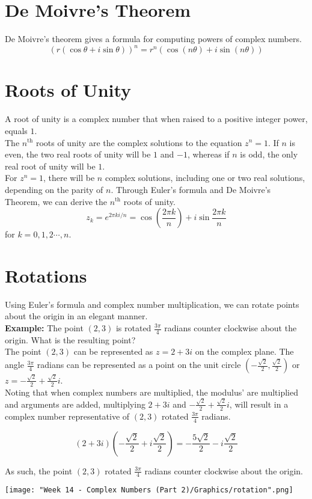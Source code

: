 \documentclass[12pt]{article}
\begin{document}
\section{De Moivre's Theorem}
De Moivre's theorem gives a formula for computing powers of complex numbers.
\begin{equation*}
    (r(\cos{\theta} + i\sin{\theta}))^n = r^n(\cos{(n\theta)} + i\sin{(n\theta)})
\end{equation*}

\section{Roots of Unity}
A root of unity is a complex number that when raised to a positive integer power, equals $1$. \\ 

The $n^{\text{th}}$ roots of unity are the complex solutions to the equation $z^n = 1$. If $n$ is even, the two real roots of unity will be $1$ and $-1$, whereas if $n$ is odd, the only real root of unity will be $1$. \\

For $z^n = 1$, there will be $n$ complex solutions, including one or two real solutions, depending on the parity of $n$. Through Euler's formula and De Moivre's Theorem, we can derive the $n^{\text{th}}$ roots of unity. $$z_k = e^{2\pi ki / n} = \cos{(\frac{2\pi k}{n})} + i\sin{\frac{2 \pi k}{n}}$$ for $k = 0, 1, 2 \cdots, n$.

\section{Rotations}
Using Euler's formula and complex number multiplication, we can rotate points about the origin in an elegant manner. \\

\textbf{Example:} The point $(2, 3)$ is rotated $\frac{3\pi}{4}$ radians counter clockwise about the origin. What is the resulting point? \\

The point $(2, 3)$ can be represented as $z = 2 + 3i$ on the complex plane. The angle $\frac{3\pi}{4}$ radians can be represented as a point on the unit circle $(-\frac{\sqrt{2}}{2}, \frac{\sqrt{2}}{2})$ or $z = -\frac{\sqrt{2}}{2} + \frac{\sqrt{2}}{2}i$. \\

Noting that when complex numbers are multiplied, the modulus' are multiplied and arguments are added, multiplying $2 + 3i$ and $-\frac{\sqrt{2}}{2} + \frac{\sqrt{2}}{2}i$, will result in a complex number representative of $(2, 3)$ rotated $\frac{3\pi}{4}$ radians.

\begin{equation*}
    (2 + 3i)(-\frac{\sqrt{2}}{2} + i\frac{\sqrt{2}}{2}) = -\frac{5\sqrt{2}}{2} - i\frac{\sqrt{2}}{2}
\end{equation*}

As such, the point $(2, 3)$ rotated $\frac{3\pi}{4}$ radians counter clockwise about the origin.

\begin{center}
    \texttt{[image: "Week 14 - Complex Numbers (Part 2)/Graphics/rotation".png]}
\end{center}
\end{document}
